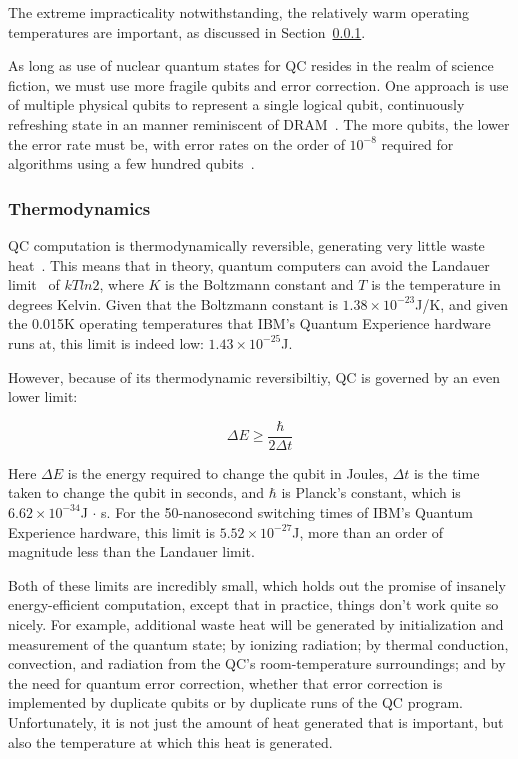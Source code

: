 The extreme impracticality notwithstanding, the relatively warm operating
temperatures are important, as discussed in
Section~\ref{sec:future:Thermodynamics}.

As long as use of nuclear quantum states for QC resides in the
realm of science fiction, we must use more fragile qubits
and error correction.
One approach is use of multiple physical qubits to represent
a single logical qubit, continuously refreshing state in an
manner reminiscent of DRAM~\cite{DanielThomasSankPhD}.
The more qubits, the lower the error rate must be, with error
rates on the order of $10^{-8}$ required for algorithms using
a few hundred qubits~\cite{DanielThomasSankPhD}.

\subsubsection{Thermodynamics}
\label{sec:future:Thermodynamics}

QC computation is thermodynamically reversible, generating
very little waste heat~\cite{Bennett:1973:LRC:1664562.1664568,RichardFeynman1986QuantumMechanicalComputers}.
This means that in theory, quantum computers can avoid the
Landauer limit~\cite{Landauer:1961:IHG:1661184.1661186}
of $kT ln 2$, where $K$ is the Boltzmann constant and $T$ is the
temperature in degrees Kelvin.
Given that the Boltzmann constant is $1.38 \times 10^{-23}$J/K,
and given the 0.015K operating temperatures that IBM's Quantum Experience
hardware runs at, this limit is indeed low: $1.43 \times 10^{-25}$J.

However, because of its thermodynamic reversibiltiy,
QC is governed by an even lower limit:

\begin{equation}
	\Delta E \geq \frac{\hbar}{2 \Delta t}
\end{equation}

Here $\Delta E$ is the energy required to change the qubit in Joules,
$\Delta t$ is the time taken to change the qubit in seconds, and
$\hbar$ is Planck's constant, which is $6.62 \times 10^{-34}$J $\cdot$ s.
For the 50-nanosecond switching times of IBM's Quantum Experience
hardware, this limit is $5.52 \times 10^{-27}$J, more than an order
of magnitude less than the Landauer limit.

Both of these limits are incredibly small, which holds out the promise
of insanely energy-efficient computation, except that
in practice, things don't work quite so nicely.
For example, additional waste heat will be generated
by initialization and measurement of the quantum state;
by ionizing radiation;
by thermal conduction, convection, and radiation from
the QC's room-temperature surroundings;
and
by the need for quantum error correction, whether that error correction
is implemented by duplicate qubits or by duplicate runs of the QC
program.
Unfortunately, it is not just the amount of heat generated that is
important, but also the temperature at which this heat is generated.

